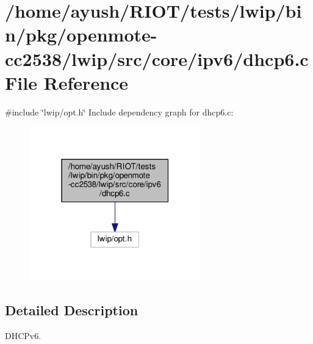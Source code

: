 \hypertarget{openmote-cc2538_2lwip_2src_2core_2ipv6_2dhcp6_8c}{}\section{/home/ayush/\+R\+I\+O\+T/tests/lwip/bin/pkg/openmote-\/cc2538/lwip/src/core/ipv6/dhcp6.c File Reference}
\label{openmote-cc2538_2lwip_2src_2core_2ipv6_2dhcp6_8c}
{\ttfamily \#include \char`\"{}lwip/opt.\+h\char`\"{}}\newline
Include dependency graph for dhcp6.\+c\+:
\nopagebreak
\begin{figure}[H]
\begin{center}
\leavevmode
\includegraphics[width=211pt]{openmote-cc2538_2lwip_2src_2core_2ipv6_2dhcp6_8c__incl}
\end{center}
\end{figure}


\subsection{Detailed Description}
D\+H\+C\+Pv6. 